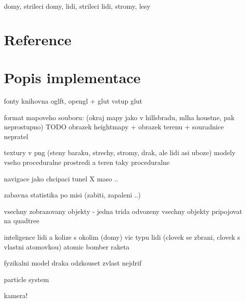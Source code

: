 \documentclass{article}
\begin{document}
domy, strileci domy, lidi, strileci lidi, stromy, lesy

\section{Reference}

\section{Popis implementace}

fonty knihovna oglft, 
opengl + glut
vstup glut

format mapoveho souboru: 
(okraj mapy jako v hillsbradu, mlha houstne, pak neprostupno)
TODO
obrazek heightmapy + obrazek terenu + souradnice nepratel

textury v png (steny baraku, strechy, stromy, drak, ale lidi asi uboze)
modely vseho proceduralne
prostredi a teren taky proceduralne

navigace jako chcipaci tunel X maso ..

zabavna statistika po misi (zabiti, zapaleni ..)

vsechny zobrazovany objekty - jedna trida odvozeny
vsechny objekty pripojovat na quadtree

inteligence lidi a kolize s okolim (domy)
vic typu lidi (clovek se zbrani, clovek s vlastni atomovkou)
atomic bomber raketa

fyzikalni model draka odzkouset zvlast nejdrif

particle system

kamera!
\end{document}
